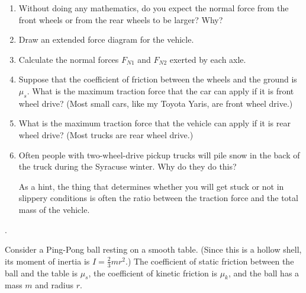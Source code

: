 \documentclass[12pt]{article}
\begin{document}
\begin{enumerate}

\item Without doing any mathematics, do you expect the normal force from the front wheels 
or from the rear wheels to be larger? Why?

\vspace{1in}

\item Draw an extended force diagram for the vehicle.

\newpage

\item Calculate the normal forces $F_{N1}$ and $F_{N2}$ exerted by each axle.

\vspace{3in}

\item Suppose that the coefficient of friction between the wheels and the ground is $\mu_s$. What is the maximum
traction force that the car can apply if it is front wheel drive? (Most small cars, like my Toyota Yaris,
are front wheel drive.)

\vspace{3.5in}

\item What is the maximum traction force that the vehicle can apply if it is rear wheel drive? (Most trucks are rear
wheel drive.)

\vspace{3.5in}

\item Often people with two-wheel-drive pickup trucks will pile snow in the back of the truck during the Syracuse winter.
Why do they do this?

As a hint, the thing that determines whether you will get stuck or not in slippery conditions is often the ratio between
the traction force and the total mass of the vehicle.



\end{enumerate}
\newpage
.
\newpage


\Large
\centerline{}
\normalsize
\centerline{}

Consider a Ping-Pong ball resting on a smooth table. (Since this is a hollow shell, its moment of inertia is 
$I=\frac{2}{3}mr^2$.) The coefficient of static friction between the ball and the table is $\mu_s$, 
the coefficient of kinetic friction is $\mu_k$, and the 
ball has a mass $m$ and radius $r$.
\end{document}
